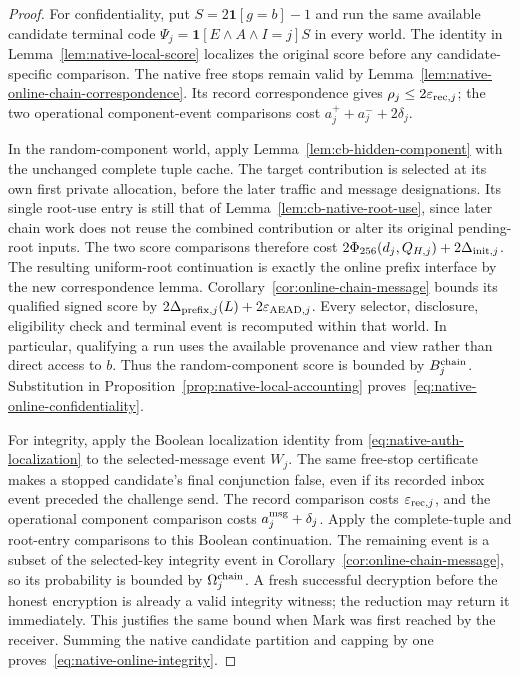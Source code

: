 \begin{proof}
For confidentiality, put
$S=2\mathbf1[g=b]-1$ and run the same available candidate terminal
code $\Psi_j=\mathbf1[E\wedge A\wedge I=j]S$ in every world.
The identity in Lemma~\ref{lem:native-local-score} localizes the
original score before any candidate-specific comparison. The native
free stops remain valid by
Lemma~\ref{lem:native-online-chain-correspondence}. Its record
correspondence gives $\rho_j\le2\varepsilon_{{\rm rec},j}$;
the two operational component-event comparisons cost
$a_j^++a_j^-+2\delta_j$.

In the random-component world, apply
Lemma~\ref{lem:cb-hidden-component} with the unchanged complete tuple
cache. The target contribution is selected at its own first private
allocation, before the later traffic and message designations. Its
single root-use entry is still that of
Lemma~\ref{lem:cb-native-root-use}, since later chain work does not
reuse the combined contribution or alter its original pending-root
inputs. The two score comparisons therefore cost
$2\Phi_{256}(d_j,Q_{H,j})+2\Delta_{{\rm init},j}$.
The resulting uniform-root continuation is exactly the online prefix
interface by the new correspondence lemma.
Corollary~\ref{cor:online-chain-message} bounds its qualified signed
score by $2\Delta_{{\rm prefix},j}(L)+2\varepsilon_{{\rm AEAD},j}$.
Every selector, disclosure, eligibility check and terminal event is
recomputed within that world. In particular, qualifying a run uses
the available provenance and view rather than direct access to $b$.
Thus the random-component score is bounded by $B_j^{\rm chain}$.
Substitution in Proposition~\ref{prop:native-local-accounting}
proves~\eqref{eq:native-online-confidentiality}.

For integrity, apply the Boolean localization identity from
\eqref{eq:native-auth-localization} to the selected-message event
$W_j$. The same free-stop certificate makes a stopped candidate's
final conjunction false, even if its recorded inbox event preceded
the challenge send. The record comparison costs
$\varepsilon_{{\rm rec},j}$, and the operational component comparison
costs $a_j^{\rm msg}+\delta_j$. Apply the complete-tuple and root-entry
comparisons to this Boolean continuation. The remaining event is a
subset of the selected-key integrity event in
Corollary~\ref{cor:online-chain-message}, so its probability is bounded
by $\Omega_j^{\rm chain}$. A fresh successful decryption before the
honest encryption is already a valid integrity witness; the reduction
may return it immediately. This justifies the same bound when Mark
was first reached by the receiver. Summing the native candidate
partition and capping by one proves~\eqref{eq:native-online-integrity}.


\end{proof}

